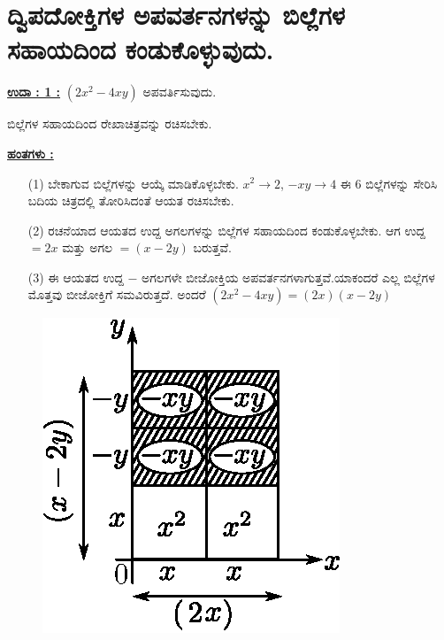 \vfill\eject

\section*{ದ್ವಿಪದೋಕ್ತಿಗಳ ಅಪವರ್ತನಗಳನ್ನು ಬಿಲ್ಲೆಗಳ ಸಹಾಯದಿಂದ ಕಂಡುಕೊಳ್ಳುವುದು.}

\noindent
{\textbf{\underline{ಉದಾ : 1 :}}} $(2x^2 - 4xy)$ ಅಪವರ್ತಿಸುವುದು.

ಬಿಲ್ಲೆಗಳ ಸಹಾಯದಿಂದ ರೇಖಾಚಿತ್ರವನ್ನು ರಚಿಸಬೇಕು. 

\noindent
{\textbf{\underline{ಹಂತಗಳು :}}}
\begin{itemize}
\item [(1)] ಬೇಕಾಗುವ ಬಿಲ್ಲೆಗಳನ್ನು ಆಯ್ಕೆ ಮಾಡಿಕೊಳ್ಳಬೇಕು. $x^2 \rightarrow 2$, $-xy \rightarrow 4$ ಈ 6 ಬಿಲ್ಲೆಗಳನ್ನು ಸೇರಿಸಿ ಬದಿಯ ಚಿತ್ರದಲ್ಲಿ ತೋರಿಸಿದಂತೆ ಆಯತ ರಚಿಸಬೇಕು. 
\item [(2)] ರಚನೆಯಾದ ಆಯತದ ಉದ್ದ ಅಗಲಗಳನ್ನು ಬಿಲ್ಲೆಗಳ ಸಹಾಯದಿಂದ ಕಂಡುಕೊಳ್ಳಬೇಕು. ಆಗ ಉದ್ದ $= 2x$ ಮತ್ತು ಅಗಲ $= (x-2y)$ ಬರುತ್ತವೆ. 
\item [(3)] ಈ ಆಯತದ ಉದ್ದ $-$ ಅಗಲಗಳೇ ಬೀಜೋಕ್ತಿಯ ಅಪವರ್ತನಗಳಾಗುತ್ತವೆ.\break ಯಾಕಂದರೆ ಎಲ್ಲ ಬಿಲ್ಲೆಗಳ ಮೊತ್ತವು ಬೀಜೋಕ್ತಿಗೆ ಸಮವಿರುತ್ತದೆ. ಅಂದರೆ $(2x^2 - 4xy) = (2x)(x-2y)$
\end{itemize}
\begin{figure}[H]
\centering
\includegraphics[scale=0.9]{src/figure/chap3/fig3-34b.eps}
\end{figure}

